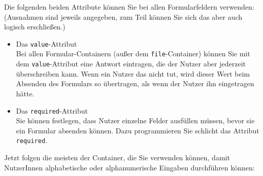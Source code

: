 Die folgenden beiden Attribute können Sie bei allen Formularfeldern verwenden: (Ausnahmen sind jeweils angegeben, zum Teil können Sie sich das aber auch logisch erschließen.)

\begin{itemize}
	\item Das \verb|value|-Attribut\\
	Bei allen Formular-Containern (außer dem \verb|file|-Container) können Sie mit dem \verb|value|-Attribut eine Antwort eintragen, die der Nutzer aber jederzeit überschreiben kann. Wenn ein Nutzer das nicht tut, wird dieser Wert beim Absenden des Formulars so übertragen, als wenn der Nutzer ihn eingetragen hätte.

	\item Das \verb|required|-Attribut\\
	Sie können festlegen, dass Nutzer einzelne Felder ausfüllen müssen, bevor sie ein Formular absenden können. Dazu programmieren Sie schlicht das Attribut \verb|required|.
\end{itemize}

Jetzt folgen die meisten der Container, die Sie verwenden können, damit NutzerInnen alphabetische oder alphanumerische Eingaben durchführen können:

